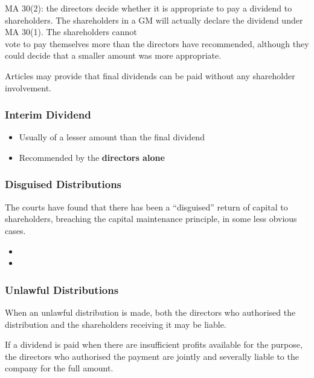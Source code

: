 \documentclass[
]{article}
\newenvironment{Shaded}{}{}
\newcommand{\NormalTok}[1]{#1}
\providecommand{\tightlist}{%
  \setlength{\itemsep}{0pt}\setlength{\parskip}{0pt}}
\begin{document}
MA 30(2): the directors decide whether it is appropriate to pay a
dividend to shareholders. The shareholders in a GM will actually declare
the dividend under MA 30(1). The shareholders cannot\\
vote to pay themselves more than the directors have recommended,
although they could decide that a smaller amount was more appropriate.

Articles may provide that final dividends can be paid without any
shareholder involvement.

\hypertarget{interim-dividend}{%
\subsubsection{Interim Dividend}\label{interim-dividend}}

\begin{itemize}
\tightlist
\item
  Usually of a lesser amount than the final dividend
\item
  Recommended by the \textbf{directors alone}
\end{itemize}

\hypertarget{disguised-distributions}{%
\subsubsection{Disguised Distributions}\label{disguised-distributions}}

The courts have found that there has been a ``disguised'' return of
capital to shareholders, breaching the capital maintenance principle, in
some less obvious cases.

\begin{itemize}
\tightlist
\item
\item
\end{itemize}

\hypertarget{unlawful-distributions}{%
\subsubsection{Unlawful Distributions}\label{unlawful-distributions}}

When an unlawful distribution is made, both the directors who authorised
the distribution and the shareholders receiving it may be liable.

\begin{Shaded}
\begin{Highlighting}[]
\NormalTok{If a dividend is paid when there are insufficient profits available for the purpose, the directors who authorised the payment are jointly and severally liable to the company for the full amount.}
\end{Highlighting}
\end{Shaded}
\end{document}
